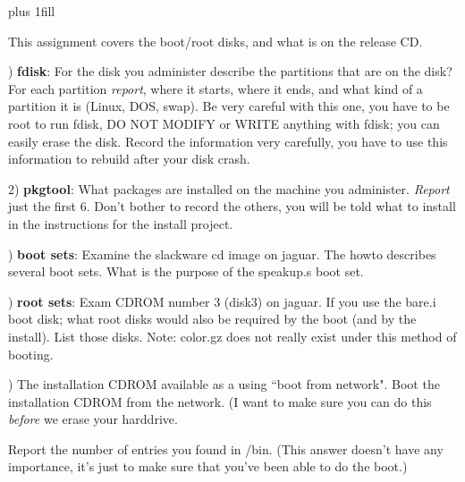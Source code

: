 
\rightskip=0pt plus 1fill

\parindent 0pt

This assignment covers the boot/root disks, and what is on the release CD.

) {\bf fdisk}:
For the disk you administer describe the partitions that are on the disk?
For each partition {\it report}, where it starts, where it ends, and what kind
of a partition it is (Linux, DOS, swap).
Be very careful with this one, you have to be root to run fdisk,
DO NOT MODIFY or WRITE anything with fdisk; 
you can easily erase the disk.
Record the information very carefully, you have to use this information
to rebuild after your disk crash.

2) {\bf pkgtool}:
What packages are installed on the machine you administer.
{\it Report} just the first 6. Don't bother to record the others, you will
be told what to install in the instructions for the install project.

) {\bf boot sets}:
Examine the slackware cd image on {\ltt{}jaguar}.
The howto describes several boot sets.
What is the purpose of the {\ltt{}speakup.s} boot set.

) {\bf root sets}:
Exam CDROM number 3 (disk3) on {\ltt{}jaguar}.
If you use the {\ltt{}bare.i} boot disk;
what root disks would also be required by the boot (and
by the install).
List those disks. Note: {\ltt{}color.gz} does not really
exist under this method of booting.

) The installation CDROM available as a using ``boot from network".
Boot the installation CDROM from the network. (I want to make sure
you can do this {\it before} we erase your harddrive.

Report the number of entries you found in {\ltt{}/bin}.
(This answer doesn't have any importance, it's just to make sure
that you've been able to do the boot.)

\bye

